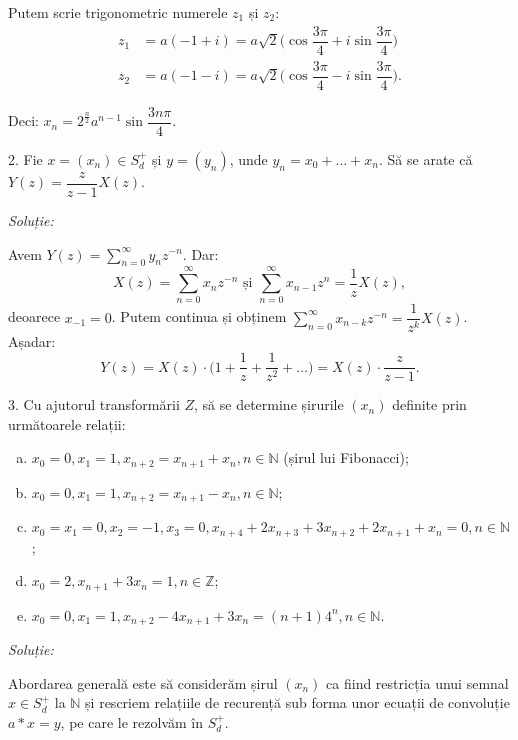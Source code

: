 Putem scrie trigonometric numerele $z_1$ și $z_2$:
\begin{align*}
  z_1 &= a(-1 + i) = a \sqrt{2} \Big( \cos \dfrac{3\pi}{4} + 
        i \sin \dfrac{3 \pi}{4} \Big) \\
  z_2 &= a(-1 - i) = a \sqrt{2} \Big( \cos \dfrac{3 \pi}{4} - 
        i \sin \dfrac{3 \pi}{4} \Big).
\end{align*}

Deci: $x_n = 2^{\frac{n}{2}} a^{n-1} \sin \dfrac{3 n \pi}{4}$.



\vspace{1cm}

2. Fie $x = (x_n) \in S_d^+$ și $y = (y_n)$, unde $y_n = x_0 + \dots + x_n$. 
Să se arate că $Y(z) = \dfrac{z}{z-1} X(z)$.

\emph{Soluție:}

Avem $Y(z) = \displaystyle\sum_{n=0}^\infty y_n z^{-n}.$ Dar: 
\[
  X(z) = \sum_{n=0}^\infty x_n z^{-n} \text{ și } 
  \sum_{n=0}^\infty x_{n-1} z^n = \dfrac{1}{z} X(z),
\]
deoarece $x_{-1} = 0$. Putem continua și obținem 
$\displaystyle\sum_{n=0}^\infty x_{n-k} z^{-n} = \dfrac{1}{z^k} X(z)$. Așadar: 
\[
  Y(z) = X(z) \cdot \Big( 1 + \dfrac{1}{z} + \dfrac{1}{z^2} + \dots \Big) 
  = X(z) \cdot \dfrac{z}{z-1}.
\]


\vspace{1cm}

3. Cu ajutorul transformării $Z$, să se determine șirurile $(x_n)$ definite 
prin următoarele relații:
\begin{enumerate}[(a)]
\item $x_0 = 0, x_1 = 1, x_{n+2} = x_{n+1} + x_n, n \in \mathbb{N}$ 
  (șirul lui Fibonacci);
\item $x_0 = 0, x_1 = 1, x_{n+2} = x_{n+1} - x_n, n \in \mathbb{N}$;
\item $x_0 = x_1 = 0, x_2 = -1, x_3 = 0, x_{n+4} + 
  2x_{n+3} + 3 x_{n+2} + 2 x_{n+1} + x_n = 0, n \in \mathbb{N}$;
\item $x_0 = 2, x_{n+1} + 3x_n = 1, n \in \mathbb{Z}$;
\item $x_0 = 0, x_1 = 1, x_{n+2} - 4 x_{n+1} + 3x_n 
  = (n+1)4^n, n \in \mathbb{N}$.
\end{enumerate}

\emph{Soluție:}

Abordarea generală este să considerăm șirul $(x_n)$ ca fiind restricția unui 
semnal $x \in S_d^+$ la $\mathbb{N}$ și rescriem relațiile de recurență sub 
forma unor ecuații de convoluție $a \ast x = y$, pe care le rezolvăm în $S_d^+$.\\

